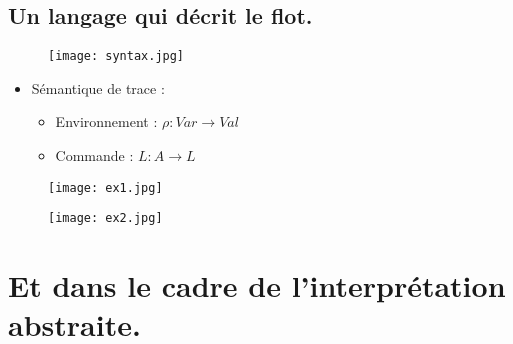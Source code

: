 \documentclass{beamer}
\begin{document}
\subsection{Un langage qui décrit le flot.}


\begin{frame}
\begin{figure}[h]
\center
\texttt{[image: syntax.jpg]}
\end{figure}
\end{frame}

\begin{frame}
\begin{itemize}
\item Sémantique de trace :
\begin{itemize}
\item Environnement : $\rho: Var \rightarrow Val$
\item Commande : $ L : A \rightarrow L$
\end{itemize} 
\end{itemize}
\end{frame}

\begin{frame}
\begin{figure}[h]
\center
\texttt{[image: ex1.jpg]}
\end{figure}
\end{frame}

\begin{frame}
\begin{figure}[h]
\center
\texttt{[image: ex2.jpg]}
\end{figure}
\end{frame}

\section{Et dans le cadre de l'interprétation abstraite.}
\end{document}
